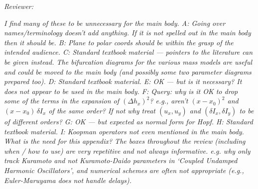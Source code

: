 \documentclass[12pt,a4paper]{article}
\newcommand{\reviewercomment}[1]{\par\smallskip\noindent\textit{Reviewer:}\par\smallskip\begingroup\itshape #1\par\endgroup\smallskip}
\begin{document}
\reviewercomment{I find many of these to be unnecessary for the main body. A: Going over names/terminology doesn't add anything. If it is not spelled out in the main body then it should be. B: Plane to polar coords should be within the grasp of the intended audience. C: Standard textbook material --- pointers to the literature can be given instead. The bifurcation diagrams for the various mass models are useful and could be moved to the main body (and possibly some two parameter diagrams prepared too). D: Standard textbook material. E: OK --- but is it necessary? It does not appear to be used in the main body. F: Query: why is it OK to drop some of the terms in the expansion of $(\Delta h_x)^2$? e.g., aren't $(x-x_0)^2$ and $(x-x_0)\,\delta I_x$ of the same order? If not why treat $(u_x, u_y)$ and $(\delta I_x, \delta I_y)$ to be of different orders? G: OK --- but expected as normal form for Hopf. H: Standard textbook material. I: Koopman operators not even mentioned in the main body. What is the need for this appendix? The boxes throughout the review (including when / how to use) are very repetitive and not always informative. e.g. why only track Kuramoto and not Kuramoto-Daido parameters in `Coupled Undamped Harmonic Oscillators', and numerical schemes are often not appropriate (e.g., Euler-Maruyama does not handle delays).}
\end{document}
